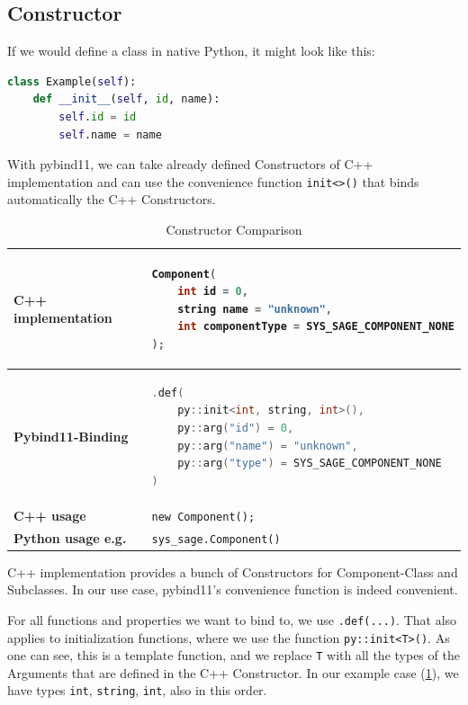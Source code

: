 \subsection{Constructor}

If we would define a class in native Python, it might look like this:

\begin{lstlisting}[language=Python, xleftmargin=4em, frame = single]
class Example(self):
    def __init__(self, id, name):
        self.id = id
        self.name = name
\end{lstlisting}

With pybind11, we can take already defined Constructors of C++ implementation and can use the convenience function \verb|init<>()| that binds automatically the C++ Constructors. \cite{pybind11-docu}

\begin{table}[htbp]
\centering
\begin{tabular}{|l|l|}
\hline
\textbf{C++ implementation} &
\begin{lstlisting}[language=C++]
Component(
    int id = 0,
    string name = "unknown",
    int componentType = SYS_SAGE_COMPONENT_NONE
);
\end{lstlisting}
\\ \hline
\textbf{Pybind11-Binding} &
\begin{lstlisting}[language=C++]
.def(
    py::init<int, string, int>(),
    py::arg("id") = 0,
    py::arg("name") = "unknown",
    py::arg("type") = SYS_SAGE_COMPONENT_NONE
)
\end{lstlisting}
\\ \hline
\textbf{C++ usage} &
\verb|new Component();| \\ \hline
\textbf{Python usage e.g.} &
\verb|sys_sage.Component()| \\ \hline
\end{tabular}
\caption{Constructor Comparison}
\label{tab:constructor}
\end{table}

C++ implementation provides a bunch of Constructors for Component-Class and Subclasses. In our use case, pybind11's convenience function is indeed convenient.

For all functions and properties we want to bind to, we use \verb|.def(...)|. That also applies to initialization functions, where we use the function \verb|py::init<T>()|. As one can see, this is a template function, and we replace \verb|T| with all the types of the Arguments that are defined in the C++ Constructor. In our example case (\ref{tab:constructor}), we have types \verb|int|, \verb|string|, \verb|int|, also in this order.\cite{pybind11-docu}

